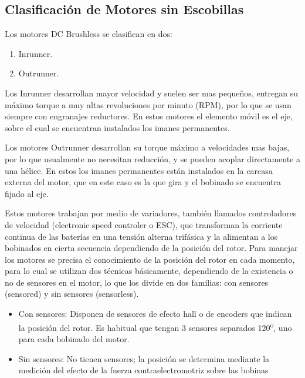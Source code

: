 
\subsection{Clasificación de Motores sin Escobillas}
\label{clasificacion_motores}

Los motores DC Brushless se clasifican en dos: 

\begin{enumerate}
\item Inrunner.
\item Outrunner.
\end{enumerate}

Los Inrunner desarrollan mayor velocidad y suelen ser mas pequeños, entregan su máximo torque a muy altas revoluciones por minuto (RPM), por lo que se usan siempre con engranajes reductores. En estos motores el elemento móvil es el eje, sobre el cual se encuentran instalados los imanes permanentes.

Los motores Outrunner desarrollan su torque máximo a velocidades mas bajas, por lo que usualmente no necesitan reducción, y se pueden acoplar directamente a una hélice. En estos los imanes permanentes están instalados en la carcasa externa del motor, que en este caso es la que gira y el bobinado se encuentra fijado al eje.

Estos motores trabajan por medio de variadores, también llamados controladores de velocidad (electronic speed controler o ESC), que transforman la corriente continua de las baterías en una tensión alterna trifásica y la alimentan a los bobinados en cierta secuencia dependiendo de la posición del rotor.
Para manejar los motores se precisa el conocimiento de la posición del rotor en cada momento, para lo cual se utilizan dos técnicas básicamente, dependiendo de la existencia o no de sensores en el motor, lo que los divide en dos familias: con sensores (sensored) y sin sensores (sensorless).

\begin{itemize}
  \item Con sensores: Disponen de sensores de efecto hall o de encoders que indican la posición del rotor. Es habitual que tengan 3 sensores separados 120\textsuperscript{o}, uno para cada bobinado del motor.
  \item Sin sensores: No tienen sensores; la posición se determina mediante la medición del efecto de la fuerza contraelectromotriz sobre las bobinas
\end{itemize}





